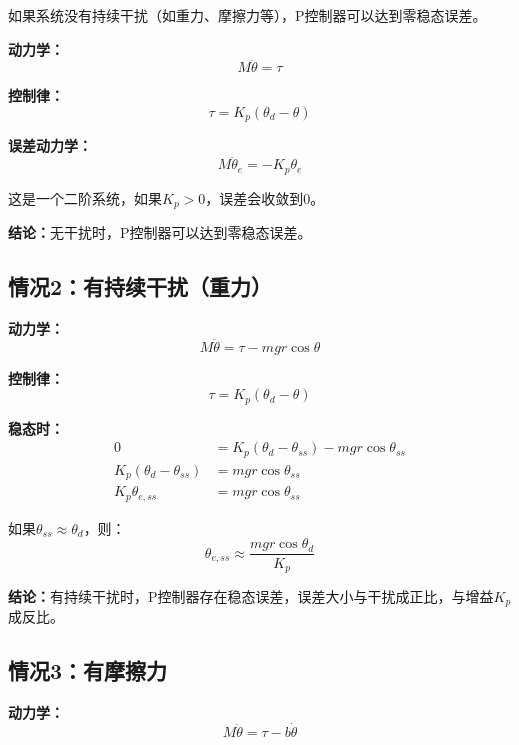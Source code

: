 \documentclass[12pt,a4paper]{article}
\begin{document}
如果系统没有持续干扰（如重力、摩擦力等），P控制器可以达到零稳态误差。

\textbf{动力学：}
\begin{equation}
M\ddot{\theta} = \tau
\end{equation}

\textbf{控制律：}
\begin{equation}
\tau = K_p(\theta_d - \theta)
\end{equation}

\textbf{误差动力学：}
\begin{equation}
M\ddot{\theta}_e = -K_p \theta_e
\end{equation}

这是一个二阶系统，如果$K_p > 0$，误差会收敛到0。

\textbf{结论：}无干扰时，P控制器可以达到零稳态误差。

\subsection{情况2：有持续干扰（重力）}

\textbf{动力学：}
\begin{equation}
M\ddot{\theta} = \tau - mgr\cos\theta
\end{equation}

\textbf{控制律：}
\begin{equation}
\tau = K_p(\theta_d - \theta)
\end{equation}

\textbf{稳态时：}
\begin{align}
0 &= K_p(\theta_d - \theta_{ss}) - mgr\cos\theta_{ss} \\
K_p(\theta_d - \theta_{ss}) &= mgr\cos\theta_{ss} \\
K_p \theta_{e,ss} &= mgr\cos\theta_{ss}
\end{align}

如果$\theta_{ss} \approx \theta_d$，则：
\begin{equation}
\theta_{e,ss} \approx \frac{mgr\cos\theta_d}{K_p}
\end{equation}

\textbf{结论：}有持续干扰时，P控制器存在稳态误差，误差大小与干扰成正比，与增益$K_p$成反比。

\subsection{情况3：有摩擦力}

\textbf{动力学：}
\begin{equation}
M\ddot{\theta} = \tau - b\dot{\theta}
\end{equation}
\end{document}
